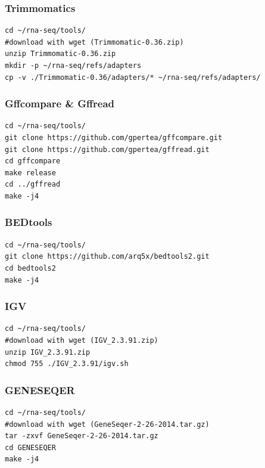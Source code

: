 \subsubsection*{Trimmomatics}
\begin{verbatim}
cd ~/rna-seq/tools/
#download with wget (Trimmomatic-0.36.zip)
unzip Trimmomatic-0.36.zip
mkdir -p ~/rna-seq/refs/adapters
cp -v ./Trimmomatic-0.36/adapters/* ~/rna-seq/refs/adapters/
\end{verbatim}

\subsubsection*{Gffcompare \& Gffread}
\begin{verbatim}
cd ~/rna-seq/tools/
git clone https://github.com/gpertea/gffcompare.git
git clone https://github.com/gpertea/gffread.git
cd gffcompare
make release
cd ../gffread
make -j4
\end{verbatim}

\subsubsection*{BEDtools}
\begin{verbatim}
cd ~/rna-seq/tools/
git clone https://github.com/arq5x/bedtools2.git
cd bedtools2
make -j4
\end{verbatim}

\subsubsection*{IGV}
\begin{verbatim}
cd ~/rna-seq/tools/
#download with wget (IGV_2.3.91.zip)
unzip IGV_2.3.91.zip
chmod 755 ./IGV_2.3.91/igv.sh
\end{verbatim}

\subsubsection*{GENESEQER}
\begin{verbatim}
cd ~/rna-seq/tools/
#download with wget (GeneSeqer-2-26-2014.tar.gz)
tar -zxvf GeneSeqer-2-26-2014.tar.gz
cd GENESEQER
make -j4
\end{verbatim}


